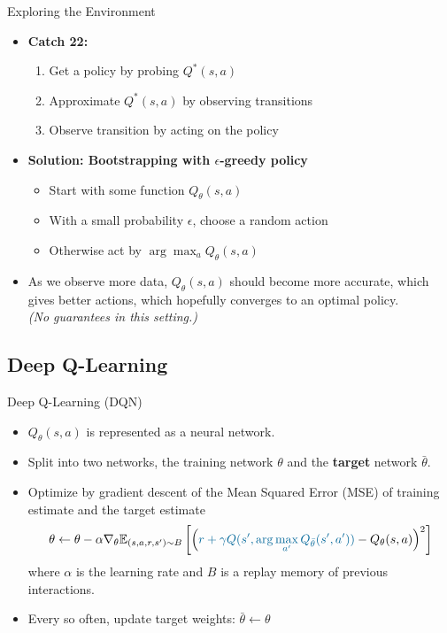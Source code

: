 \documentclass[aspectratio=1609,handout]{beamer}
\newcommand{\tcolorbf}[2]{\textbf{\textcolor{#1}{#2}}}
\newcommand{\mcolor}[2]{\textcolor{#1}{#2}}
\begin{document}
\begin{frame}{Exploring the Environment}
  \begin{itemize}
  \setlength\itemsep{2mm}
  \item<1-> \textbf{Catch 22:}
        \begin{enumerate}
        \setlength\itemsep{2mm}
        \item<2-> Get a policy by probing $Q^*(s,a)$
        \item<3-> Approximate $Q^*(s,a)$ by observing transitions
        \item<4-> Observe transition by acting on the policy
        \end{enumerate}
  \item<5-> \textbf{Solution: Bootstrapping with $\epsilon$-greedy policy}
        \begin{itemize}
        \setlength\itemsep{2mm}
        \item<6-> Start with some function $Q_\theta(s,a)$
        \item<7-> With a small probability $\epsilon$, choose a random action
        \item<8-> Otherwise act by $\arg\max_a Q_\theta(s,a)$
        \end{itemize}
  \item<9-> As we observe more data, $Q_\theta(s,a)$ should become more accurate,
        which gives better actions, which hopefully converges to an optimal
        policy.\\[1mm]\emph{\small(No guarantees in this setting.)}
  \end{itemize}
\end{frame}

\subsection{Deep Q-Learning}

\begin{frame}{Deep Q-Learning (DQN)}
  \begin{itemize}
  \setlength\itemsep{2mm}
  \item<1-> $Q_\theta(s, a)$ is represented as a neural network.
  \item<2-> Split into two networks, the training network $\theta$ and the
        \tcolorbf{mathcolor1}{target} network $\bar{\theta}$.
  \item<3-> Optimize by gradient descent of the Mean Squared Error (MSE) of
        training estimate and the target estimate
        \begin{equation}
        \theta \leftarrow \theta -
        \alpha \nabla_\theta \mathbb{E}_{(s,a,r,s') \sim B}\left[\left(
          \mcolor{mathcolor1}{r + \gamma Q(s', \arg\max_{a'} Q_{\bar{\theta}}(s', a'))}
          - Q_\theta(s,a)
        \right)^2\right]
        \end{equation}
        where $\alpha$ is the learning rate and $B$ is a replay memory of
        previous interactions.
  \item<4-> Every so often, update target weights: $\bar{\theta} \leftarrow \theta$
  \end{itemize}
\end{frame}
\end{document}
